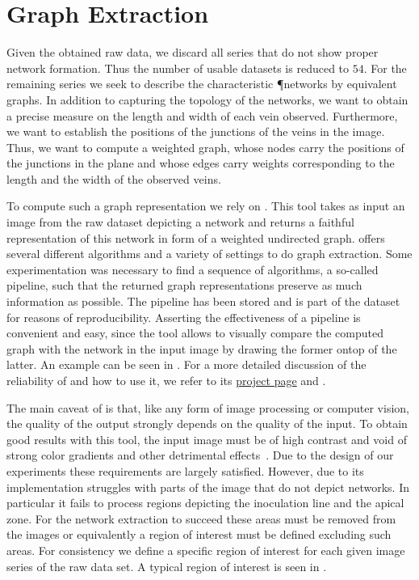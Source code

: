 	\section{Graph Extraction}

		Given the obtained raw data, we discard all series that do not show proper network formation. Thus the number of usable datasets is reduced to $54$. For the remaining series we seek to describe the characteristic \P networks by equivalent graphs. In addition to capturing the topology of the networks, we want to obtain a precise measure on the length and width of each vein observed. Furthermore, we want to establish the positions of the junctions of the veins in the image. Thus, we want to compute a weighted graph, whose nodes carry the positions of the junctions in the plane and whose edges carry weights corresponding to the length and the width of the observed veins. 

		To compute such a graph representation we rely on \NEFI. This tool takes as input an image from the raw dataset depicting a network and returns a faithful representation of this network in form of a weighted undirected graph. \NEFI offers several different algorithms and a variety of settings to do graph extraction. Some experimentation was necessary to find a sequence of algorithms, a so-called pipeline, such that the returned graph representations preserve as much information as possible. The pipeline has been stored and is part of the dataset for reasons of reproducibility. Asserting the effectiveness of a pipeline is convenient and easy, since the tool allows to visually compare the computed graph with the network in the input image by drawing the former ontop of the latter. An example can be seen in . For a more detailed discussion of the reliability of \NEFI and how to use it, we refer to its \href{http://nefi.mpi-inf.mpg.de}{project page} and .

		The main caveat of \NEFI is that, like any form of image processing or computer vision, the quality of the output strongly depends on the quality of the input. To obtain good results with this tool, the input image must be of high contrast and void of strong color gradients and other detrimental effects~\cite{dirnberger2015nefi}. Due to the design of our experiments these requirements are largely satisfied. However, due to its implementation \NEFI struggles with parts of the image that do not depict networks. In particular it fails to process regions depicting the inoculation line and the apical zone. For the network extraction to succeed these areas must be removed from the images or equivalently a region of interest must be defined excluding such areas. For consistency we define a specific region of interest for each given image series of the raw data set. A typical region of interest is seen in .

